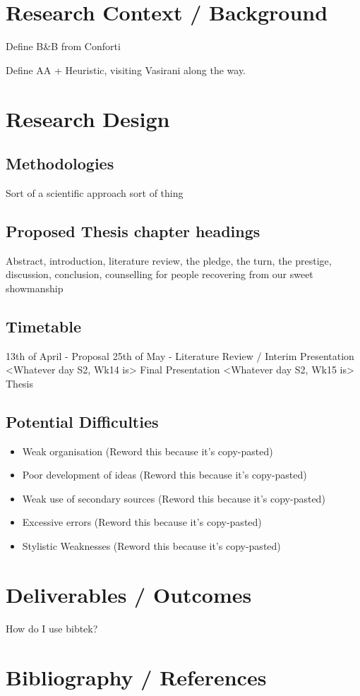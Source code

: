 \documentclass[12pt, a4paper]{article}
\begin{document}
\section{Research Context / Background}

Define B\&B from Conforti

Define AA + Heuristic, visiting Vasirani along the way.

\section{Research Design}

\subsection{Methodologies}

Sort of a scientific approach sort of thing

\subsection{Proposed Thesis chapter headings}
Abstract, introduction, literature review, the pledge, the turn, the prestige, discussion, conclusion, counselling for people recovering from our sweet showmanship
\subsection{Timetable}
13th of April - Proposal
25th of May - Literature Review / Interim Presentation
<Whatever day S2, Wk14 is> Final Presentation
<Whatever day S2, Wk15 is> Thesis

\subsection{Potential Difficulties}
\begin{itemize}
  \item Weak organisation (Reword this because it's copy-pasted)
  \item Poor development of ideas (Reword this because it's copy-pasted)
  \item Weak use of secondary sources (Reword this because it's copy-pasted)
  \item Excessive errors (Reword this because it's copy-pasted)
  \item Stylistic Weaknesses (Reword this because it's copy-pasted)
\end{itemize}

\section{Deliverables / Outcomes}
How do I use bibtek?~\cite{BOOK:1}
\section{Bibliography / References}


\end{document}
